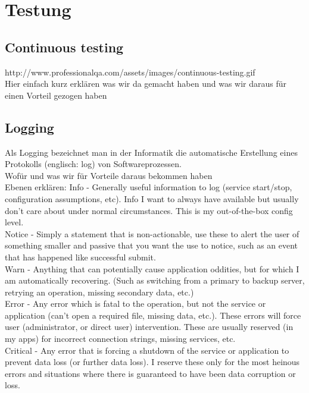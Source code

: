 
\chapter{Testung}


\section{Continuous testing}
http://www.professionalqa.com/assets/images/continuous-testing.gif
\\
Hier einfach kurz erklären was wir da gemacht haben und was wir daraus für einen Vorteil gezogen haben

\section{Logging}
Als Logging bezeichnet man in der Informatik die automatische Erstellung eines Protokolls (englisch: log) von Softwareprozessen.
\\
Wofür und was wir für Vorteile daraus bekommen haben
\\
Ebenen erklären:
Info - Generally useful information to log (service start/stop, configuration assumptions, etc). Info I want to always have available but usually don't care about under normal circumstances. This is my out-of-the-box config level.
\\
Notice - Simply a statement that is non-actionable, use these to alert the user of something smaller and passive that you want the use to notice, such as an event that has happened like successful submit.
\\
Warn - Anything that can potentially cause application oddities, but for which I am automatically recovering. (Such as switching from a primary to backup server, retrying an operation, missing secondary data, etc.)
\\
Error - Any error which is fatal to the operation, but not the service or application (can't open a required file, missing data, etc.). These errors will force user (administrator, or direct user) intervention. These are usually reserved (in my apps) for incorrect connection strings, missing services, etc.
\\
Critical - Any error that is forcing a shutdown of the service or application to prevent data loss (or further data loss). I reserve these only for the most heinous errors and situations where there is guaranteed to have been data corruption or loss.



